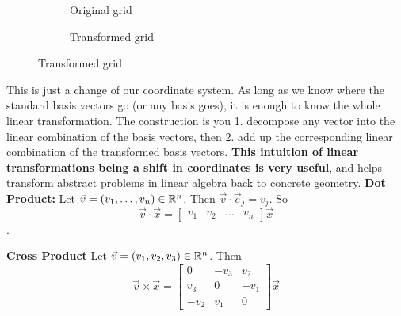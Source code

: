\begin{figure}[h]
	\begin{subfigure}[l]{0.4\textwidth}
			\caption{Original grid}
	\end{subfigure}
	\begin{subfigure}[r]{0.6\textwidth}
			\caption{Transformed grid}
	\end{subfigure}
\end{figure}
This is just a change of our coordinate system. As long as we know where the standard basis vectors go (or any basis goes), it is enough to know the whole linear transformation. The construction is you 1. decompose any vector into the linear combination of the basis vectors, then 2. add up the corresponding linear combination of the transformed basis vectors. \textbf{This intuition of linear transformations being a shift in coordinates is very useful}, and helps transform abstract problems in linear algebra back to concrete geometry. 
\textbf{Dot Product: }Let $\vec{v}=(v_1,\ldots,v_n)\in\mathbb{R}^n$. Then $\vec{v}\cdot\vec{e}_j=v_j$. So \[\vec{v}\cdot\vec{x} = \begin{bmatrix}
	v_1 & v_2 &  \ldots & v_n
\end{bmatrix}\vec{x}\].

\textbf{Cross Product} Let $\vec{v}=(v_1,v_2,v_3)\in\mathbb{R}^n$. Then \[
	\vec{v}\times\vec{x} = \begin{bmatrix}
		0 & -v_3 & v_2\\
		v_3 & 0 & -v_1\\
		-v_2 & v_1 & 0
	\end{bmatrix}\vec{x}
\]

